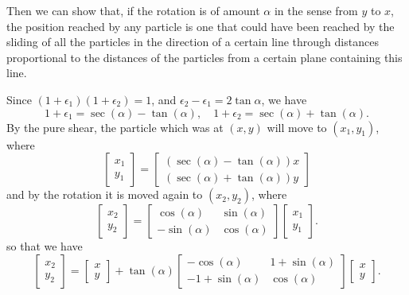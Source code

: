 Then we can show that, if the rotation is of amount \(\alpha\) in the sense
from \(y\) to \(x\), the position reached by any particle is one that could
have been reached by the sliding of all the particles in the direction of a
certain line through distances proportional to the distances of the particles
from a certain plane containing this line. 

Since \((1+\epsilon_1)(1+\epsilon_2)=1\), and \(\epsilon_2 -\epsilon_1 = 2 \tan
\alpha\), we have 
\[
1 + \epsilon_1 = \sec(\alpha ) - \tan(\alpha ), \quad
1 + \epsilon_2 = \sec(\alpha ) + \tan(\alpha ).
\] 
By the pure shear, the particle which was at
\((x, y)\)
will move to
\((x_1,y_1)\), where 
\[
\begin{bmatrix}
x_1\\
y_1 
\end{bmatrix}=
\begin{bmatrix}
(\sec(\alpha ) - \tan(\alpha ))x\\
(\sec(\alpha ) + \tan(\alpha ))y 
\end{bmatrix}
\] 
and by the rotation it is moved again to
\((x_2,y_2)\), where
\[
\begin{bmatrix} x_2\\ y_2 \end{bmatrix}=
\begin{bmatrix}
\cos(\alpha ) & \sin(\alpha )\\
-\sin(\alpha ) & \cos(\alpha )
\end{bmatrix}
\begin{bmatrix} x_1\\ y_1 \end{bmatrix}.
\] 
so that we have
\[
\begin{bmatrix} x_2\\ y_2 \end{bmatrix}=
\begin{bmatrix} x\\ y \end{bmatrix}+ \tan(\alpha) 
\begin{bmatrix}
-\cos(\alpha )  & 1+\sin(\alpha )\\
-1+\sin(\alpha )& \cos(\alpha )
\end{bmatrix}
\begin{bmatrix}
x\\
y
\end{bmatrix}.
\]

